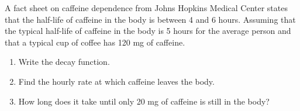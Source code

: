 \begin{example}
    A fact sheet on caffeine dependence from Johns Hopkins Medical Center states that the half-life of caffeine in the body is between 4 and 6 hours. Assuming that the typical half-life of caffeine in the body is 5 hours for the average person and that a typical cup of coffee has 120 mg of caffeine.
    \begin{enumerate}
        \item Write the decay function.
        \item Find the hourly rate at which caffeine leaves the body.
        \item How long does it take until only 20 mg of caffeine is still in the body?
    \end{enumerate}
\end{example}

